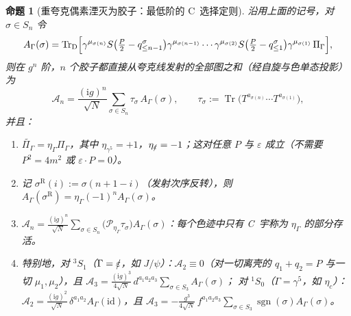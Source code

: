 \documentclass[UTF8,a4paper,11pt,fontset=fandol]{ctexart}
\theoremstyle{cplain}
\newtheorem{proposition}[theorem]{命题}
\theoremstyle{cdefinition}
\theoremstyle{cremark}
\numberwithin{equation}{section}
\DeclareMathOperator{\Tr}{Tr}
\newcommand{\TrD}{\operatorname{Tr}_{\mathrm{D}}}   %
\newcommand{\sla}[1]{\slashed{#1}}                  %
\newcommand{\ii}{\mathrm{i}}                        %
\newcommand{\Cconj}[1]{\widetilde{#1}}              %
\begin{document}
\begin{proposition}[重夸克偶素湮灭为胶子：最低阶的 C~选择定则]\label{prop:app-quarkonium}
沿用上面的记号，对 $\sigma\in S_n$ 令
\begin{equation}\label{eq:app-onium-A}
A_\Gamma(\sigma)=\TrD\Bigl[\gamma^{\mu_{\sigma(n)}}S\bigl(\tfrac P2-q^\sigma_{\le n-1}\bigr)\gamma^{\mu_{\sigma(n-1)}}\cdots\gamma^{\mu_{\sigma(2)}}S\bigl(\tfrac P2-q^\sigma_{\le1}\bigr)\gamma^{\mu_{\sigma(1)}}\,\Pi_\Gamma\Bigr],
\end{equation}
则在 $g^n$ 阶，$n$ 个胶子都直接从夸克线发射的全部图之和（经自旋与色单态投影）为
\begin{equation}\label{eq:app-onium-amp}
\mathcal A_n=\frac{(\ii g)^n}{\sqrt N}\sum_{\sigma\in S_n}\tau_\sigma\,A_\Gamma(\sigma),\qquad \tau_\sigma:=\Tr\bigl(T^{a_{\sigma(n)}}\cdots T^{a_{\sigma(1)}}\bigr),
\end{equation}
并且：
\begin{enumerate}[label=(\roman*),leftmargin=2em,itemsep=1pt,topsep=2pt]
\item $\Cconj{\Pi_\Gamma}=\eta_\Gamma\Pi_\Gamma$，其中 $\eta_{\gamma^5}=+1$，$\eta_{\sla\varepsilon}=-1$；这对任意 $P$ 与 $\varepsilon$ 成立（不需要 $P^2=4m^2$ 或 $\varepsilon\cdot P=0$）。
\item 记 $\sigma^{\mathrm R}(i):=\sigma(n+1-i)$（发射次序反转），则 $A_\Gamma(\sigma^{\mathrm R})=\eta_\Gamma(-1)^n A_\Gamma(\sigma)$。
\item $\mathcal A_n=\frac{(\ii g)^n}{\sqrt N}\sum_{\sigma\in S_n}\bigl(\mathcal P_{\eta_\Gamma}\tau_\sigma\bigr)A_\Gamma(\sigma)$：每个色迹中只有 C~宇称为 $\eta_\Gamma$ 的部分存活。
\item 特别地，对 ${}^3S_1$（$\Gamma=\sla\varepsilon$，如 $J/\psi$）：$\mathcal A_2\equiv0$（对一切离壳的 $q_1+q_2=P$ 与一切 $\mu_1,\mu_2$），且
$\mathcal A_3=\frac{(\ii g)^3}{4\sqrt N}\,d^{a_1a_2a_3}\sum_{\sigma\in S_3}A_\Gamma(\sigma)$；
对 ${}^1S_0$（$\Gamma=\gamma^5$，如 $\eta_c$）：$\mathcal A_2=\frac{(\ii g)^2}{\sqrt N}\,\delta^{a_1a_2}A_\Gamma(\mathrm{id})$，且
$\mathcal A_3=-\frac{g^3}{4\sqrt N}\,f^{a_1a_2a_3}\sum_{\sigma\in S_3}\operatorname{sgn}(\sigma)A_\Gamma(\sigma)$。
\end{enumerate}
\end{proposition}
\end{document}
